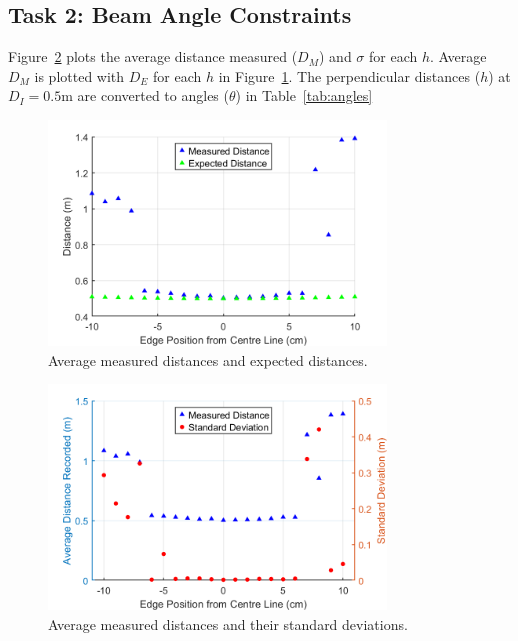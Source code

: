 \documentclass[a4paper,12pt]{article}
\begin{document}
\break


\subsection{Task 2: Beam Angle Constraints}
Figure~\ref{fig:distandSE} plots the average distance measured ($D_M$) and $\sigma$ for each $h$.
Average $D_{M}$ is plotted with $D_{E}$ for each $h$ in Figure~\ref{fig:distandExpected}.
The perpendicular distances ($h$) at $D_{I}=0.5$m are converted to angles ($\theta$) in Table~\ref{tab:angles}


\begin{figure}[htbp]
    \centering
    \includegraphics[width=0.8\textwidth]{figs/distAndExpected.png}
    \caption{Average measured distances and expected distances.}
    \label{fig:distandExpected}
\end{figure}

\begin{figure}[htbp]
    \centering
    \includegraphics[width=0.8\textwidth]{figs/task2.png}
    \caption{Average measured distances and their standard deviations.}
    \label{fig:distandSE}
\end{figure}
\end{document}
